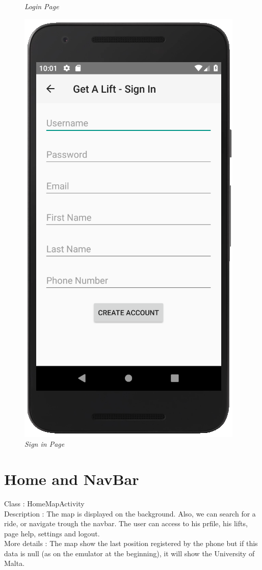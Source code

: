 \begin{figure}[h!]
\begin{minipage}[b]{0.48\linewidth}
\caption{\it Login Page}
   \end{minipage}\hfill
   \begin{minipage}[b]{0.50\linewidth}   
      \centering \includegraphics[scale = 0.8]{diagrams/Create_account.png}
      \caption{\it Sign in Page}
   \end{minipage}
\end{figure}

\section{Home and NavBar}
Class : HomeMapActivity \\
Description : The map is displayed on the background. Also, we can search for a ride, or navigate trough the navbar. The user can access to his prfile, his lifts, page help, settings and logout. \\
More details : The map show the last position registered by the phone but if this data is null (as on the emulator at the beginning), it will show the University of Malta. 

